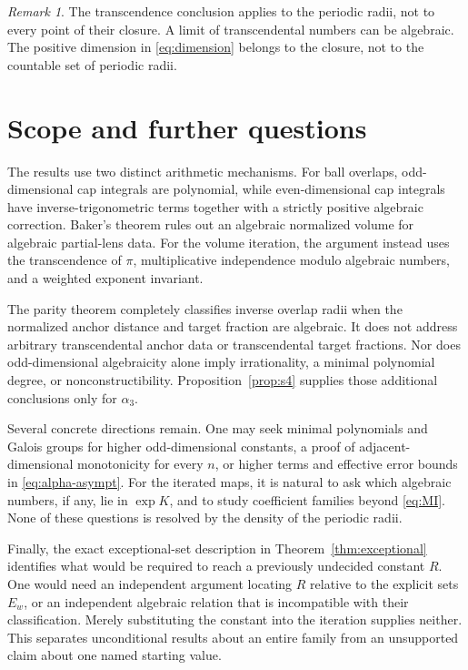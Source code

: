\documentclass[11pt,a4paper]{article}
\numberwithin{equation}{section}
\theoremstyle{definition}
\theoremstyle{remark}
\newtheorem{remark}[theorem]{Remark}
\begin{document}
\begin{remark}
The transcendence conclusion applies to the periodic radii, not to every point of their closure. A limit of transcendental numbers can be algebraic. The positive dimension in \eqref{eq:dimension} belongs to the closure, not to the countable set of periodic radii.
\end{remark}

\section{Scope and further questions}\label{sec:scope}

The results use two distinct arithmetic mechanisms. For ball overlaps, odd-dimensional cap integrals are polynomial, while even-dimensional cap integrals have inverse-trigonometric terms together with a strictly positive algebraic correction. Baker's theorem rules out an algebraic normalized volume for algebraic partial-lens data. For the volume iteration, the argument instead uses the transcendence of $\pi$, multiplicative independence modulo algebraic numbers, and a weighted exponent invariant.

The parity theorem completely classifies inverse overlap radii when the normalized anchor distance and target fraction are algebraic. It does not address arbitrary transcendental anchor data or transcendental target fractions. Nor does odd-dimensional algebraicity alone imply irrationality, a minimal polynomial degree, or nonconstructibility. Proposition~\ref{prop:s4} supplies those additional conclusions only for $\alpha_3$.

Several concrete directions remain. One may seek minimal polynomials and Galois groups for higher odd-dimensional constants, a proof of adjacent-dimensional monotonicity for every $n$, or higher terms and effective error bounds in \eqref{eq:alpha-asympt}. For the iterated maps, it is natural to ask which algebraic numbers, if any, lie in $\exp K$, and to study coefficient families beyond \eqref{eq:MI}. None of these questions is resolved by the density of the periodic radii.

Finally, the exact exceptional-set description in Theorem~\ref{thm:exceptional} identifies what would be required to reach a previously undecided constant $R$. One would need an independent argument locating $R$ relative to the explicit sets $E_w$, or an independent algebraic relation that is incompatible with their classification. Merely substituting the constant into the iteration supplies neither. This separates unconditional results about an entire family from an unsupported claim about one named starting value.
\end{document}
